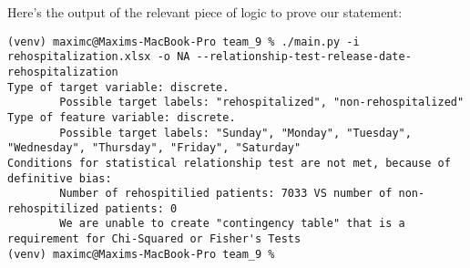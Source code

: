 \documentclass[a4paper,landscape]{article}
\begin{document}
Here's the output of the relevant piece of logic to prove our statement:

\begin{verbatim}
(venv) maximc@Maxims-MacBook-Pro team_9 % ./main.py -i rehospitalization.xlsx -o NA --relationship-test-release-date-rehospitalization
Type of target variable: discrete.
        Possible target labels: "rehospitalized", "non-rehospitalized"
Type of feature variable: discrete.
        Possible target labels: "Sunday", "Monday", "Tuesday", "Wednesday", "Thursday", "Friday", "Saturday"
Conditions for statistical relationship test are not met, because of definitive bias:
        Number of rehospitilied patients: 7033 VS number of non-rehospitilized patients: 0
        We are unable to create "contingency table" that is a requirement for Chi-Squared or Fisher's Tests
(venv) maximc@Maxims-MacBook-Pro team_9 %
\end{verbatim}
\end{document}
